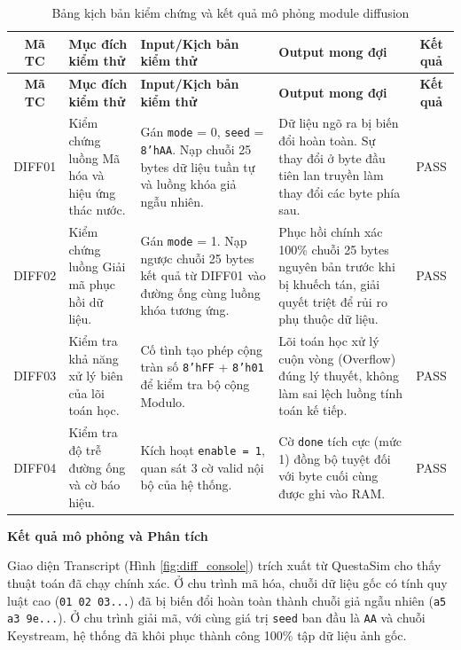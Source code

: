 {
	\renewcommand{\arraystretch}{1.4}
	\begin{longtable}{|c|p{3.2cm}|p{3.6cm}|p{4.2cm}|c|}
		\caption{Bảng kịch bản kiểm chứng và kết quả mô phỏng module diffusion}
		\label{bang_testcase_diff_tonghop} \\
		\hline
		\textbf{Mã TC} & \textbf{Mục đích kiểm thử} & \textbf{Input/Kịch bản kiểm thử} & \textbf{Output mong đợi} & \textbf{Kết quả} \\ \hline
		\endfirsthead
		
		\hline
		\textbf{Mã TC} & \textbf{Mục đích kiểm thử} & \textbf{Input/Kịch bản kiểm thử} & \textbf{Output mong đợi} & \textbf{Kết quả} \\ \hline
		\endhead
		
		DIFF01 & Kiểm chứng luồng Mã hóa và hiệu ứng thác nước. & Gán \texttt{mode} = 0, \texttt{seed} = \texttt{8'hAA}. Nạp chuỗi 25 bytes dữ liệu tuần tự và luồng khóa giả ngẫu nhiên. & Dữ liệu ngõ ra bị biến đổi hoàn toàn. Sự thay đổi ở byte đầu tiên lan truyền làm thay đổi các byte phía sau. & PASS \\ \hline
		
		DIFF02 & Kiểm chứng luồng Giải mã phục hồi dữ liệu. & Gán \texttt{mode} = 1. Nạp ngược chuỗi 25 bytes kết quả từ DIFF01 vào đường ống cùng luồng khóa tương ứng. & Phục hồi chính xác 100\% chuỗi 25 bytes nguyên bản trước khi bị khuếch tán, giải quyết triệt để rủi ro phụ thuộc dữ liệu. & PASS \\ \hline
		
		DIFF03 & Kiểm tra khả năng xử lý biên của lõi toán học. & Cố tình tạo phép cộng tràn số \texttt{8'hFF} + \texttt{8'h01} để kiểm tra bộ cộng Modulo. & Lõi toán học xử lý cuộn vòng (Overflow) đúng lý thuyết, không làm sai lệch luồng tính toán kế tiếp. & PASS \\ \hline
		
		DIFF04 & Kiểm tra độ trễ đường ống và cờ báo hiệu. & Kích hoạt \texttt{enable = 1}, quan sát 3 cờ valid nội bộ của hệ thống. & Cờ \texttt{done} tích cực (mức 1) đồng bộ tuyệt đối với byte cuối cùng được ghi vào RAM. & PASS \\ \hline
	\end{longtable}
}

\textbf{Kết quả mô phỏng và Phân tích}

Giao diện Transcript (Hình \ref{fig:diff_console}) trích xuất từ QuestaSim cho thấy thuật toán đã chạy chính xác. Ở chu trình mã hóa, chuỗi dữ liệu gốc có tính quy luật cao (\texttt{01 02 03...}) đã bị biến đổi hoàn toàn thành chuỗi giả ngẫu nhiên (\texttt{a5 a3 9e...}). Ở chu trình giải mã, với cùng giá trị \texttt{seed} ban đầu là \texttt{AA} và chuỗi Keystream, hệ thống đã khôi phục thành công 100\% tập dữ liệu ảnh gốc.

